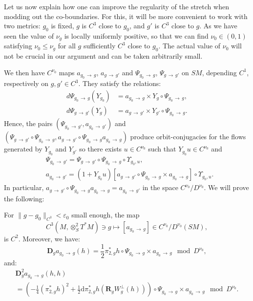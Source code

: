 \documentclass[AHL,Unicode,longabstracts,published]{cedram}
\newcommand{\RR}{\mathbf{R}}
\newcommand{\bdD}{\mathbf{D}}
\newcommand{\eps}{\varepsilon}
\newcommand{\dd}{\mathrm{d}}
\begin{document}
Let us now explain how one can improve the regularity of the stretch when modding out the co-boundaries. For this, it will be more convenient to work with two metrics: $g_0$ is fixed, $g$ is $C^3$ close to $g_0$, and $g'$ is $C^3$ close to $g$. As we have seen the value of $\nu_g$ is locally uniformly positive, so that we can find $\nu_0\in (0,1)$ satisfying $\nu_0 \leq \nu_g$ for all $g$ sufficiently $C^3$ close to $g_0$. The actual value of $\nu_0$ will not be crucial in our argument and can be taken arbitrarily small.

We then have $C^{\nu_0}$ maps $a_{g_0\,\to\,g}$, $a_{g\,\to\,g'}$ and $\Psi_{g_0\,\to\,g}$, $\Psi_{g\,\to\,g'}$ on $SM$, depending $C^1$, respectively on $g,g'\in C^3$. They satisfy the relations:
\begin{equation}
\begin{split}
d \Psi_{g_0\,\to\,g}(Y_{g_0}) &= a_{g_0\,\to\,g}\times Y_g \circ \Psi_{g_0\,\to\,g},\label{eq:conjugation-bis}
\\
d \Psi_{g\,\to\,g'} (Y_g) &= a_{g\,\to\,g'} \times Y_{g'}\circ \Psi_{g_0\,\to\,g}.
\end{split}
\end{equation}
Hence, the pairs $(\Psi_{g_0\,\to\,g'},a_{g_0\, \to\,g'})$ and $(\Psi_{g\,\to\,g'} \circ \Psi_{g_0\,\to\,g}, a_{g\,\to\,g'} \circ \Psi_{g_0\,\to\,g} a_{g_0\,\to\,g})$ produce orbit-conjugacies for the flows generated by $Y_{g_0}$ and $Y_{g'}$ so there exists $u \in C^{\nu_0}$ such that $Y_{g_0} u \in C^{\nu_0}$ and
\begin{equation}\label{equation:life}
\begin{split}
& \Psi_{g_0\,\to\,g'} = \Psi_{g\,\to\,g'} \circ \Psi_{g_0\,\to\,g}\circ \Upsilon_{g_0,u}, \\
&a_{g_0\,\to\,g'} = \left(1 + Y_{g_0} u\right) \left[a_{g\,\to\,g'} \circ \Psi_{g_0\,\to\,g} \times a_{g_0\,\to\,g}\right] \circ \Upsilon_{g_0,u}.
\end{split}
\end{equation}
In particular, $a_{g\,\to\,g'} \circ \Psi_{g_0 \,\to\,g} a_{g_0\,\to\,g} = a_{g_0\,\to\,g'}$ in the space $C^{\nu_0}/D^{\nu_0}$. We will prove the following:



\begin{lemm}\label{lemma:derivative-stretch-mod-Dnu}
For $\|g - g_0\|_{C^3} < \eps_0$ small enough, the map
\[
C^3\left(M,\otimes^2_S T^*M\right) \ni g \mapsto [a_{g_0\,\to\,g}] \in C^{\nu_0}/D^{\nu_0}(SM),
\]
is $C^2$. Moreover, we have:
\begin{equation}\label{eq:log-derivative-stretch}
\bdD_g a_{g_0\,\to\,g} (h) = \frac{1}{2}\pi_{2,g}^\ast h \circ \Psi_{g_0\,\to\,g} \times a_{g_0\,\to\,g} \mod D^{\nu_0},
\end{equation}
and:
\begin{multline}\label{equation:seconde-derivative}
\bdD^2_{g} a_{g_0\,\to\,g}(h,h) \\
= \left(-\frac{1}{4} \left(\pi_{2,g}^\ast h\right)^2 + \frac{1}{2} \dd \pi_{2,g}^\ast h\left(\RR_g W^\bot_g(h) \right)\right) \circ \Psi_{g_0\,\to\,g} \times a_{g_0\,\to\,g} \mod D^{\nu_0}.
\end{multline}
\end{lemm}
\end{document}
